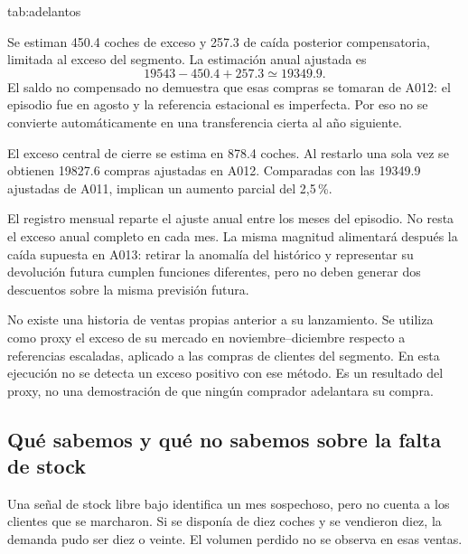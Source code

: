 {tab:adelantos}{}

Se estiman \num{450.4} coches de exceso y \num{257.3} de caída posterior
compensatoria, limitada al exceso del segmento. La estimación anual ajustada es
\begin{equation}
 \num{19543}-\num{450.4}+\num{257.3}\simeq\num{19349.9}.
\end{equation}
El saldo no compensado no demuestra que esas compras se tomaran de A012: el
episodio fue en agosto y la referencia estacional es imperfecta. Por eso no se
convierte automáticamente en una transferencia cierta al año siguiente.

El exceso central de cierre se estima en \num{878.4} coches. Al restarlo una
sola vez se obtienen \num{19827.6} compras ajustadas en A012. Comparadas con
las \num{19349.9} ajustadas de A011, implican un aumento parcial del 2,5\,\%.

El registro mensual reparte el ajuste anual entre los meses del episodio. No
resta el exceso anual completo en cada mes. La misma magnitud alimentará después
la caída supuesta en A013: retirar la anomalía del histórico y representar su
devolución futura cumplen funciones diferentes, pero no deben generar dos
descuentos sobre la misma previsión futura.

No existe una historia de ventas propias anterior a su lanzamiento. Se utiliza
como proxy el exceso de su mercado en noviembre--diciembre respecto a referencias
escaladas, aplicado a las compras de clientes del segmento. En esta ejecución no
se detecta un exceso positivo con ese método. Es un resultado del proxy, no una
demostración de que ningún comprador adelantara su compra.

\subsection{Qué sabemos y qué no sabemos sobre la falta de stock}
Una señal de stock libre bajo identifica un mes sospechoso, pero no cuenta a
los clientes que se marcharon. Si se disponía de diez coches y se vendieron
diez, la demanda pudo ser diez o veinte. El volumen perdido no se observa en
esas ventas.

